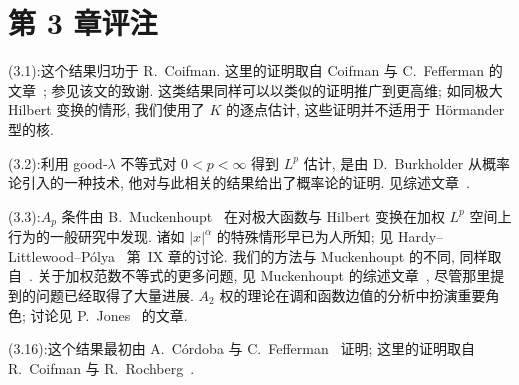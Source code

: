 \section{第 3 章评注}
\label{sec:3.4}

\noindent (3.1):\quad 这个结果归功于 R.~Coifman. 这里的证明取自 Coifman 与 C.~Fefferman 的文章~\cite{coifman-fefferman}; 参见该文的致谢. 这类结果同样可以以类似的证明推广到更高维; 如同极大 Hilbert 变换的情形, 我们使用了 $K$ 的逐点估计, 这些证明并不适用于 H\"ormander 型的核.

\noindent (3.2):\quad 利用 good-$\lambda$ 不等式对 $0<p<\infty$ 得到 $L^{p}$ 估计, 是由 D.~Burkholder 从概率论引入的一种技术, 他对与此相关的结果给出了概率论的证明. 见综述文章~\cite{burkholder}.

\noindent (3.3):\quad $A_p$ 条件由 B.~Muckenhoupt~\cite{muckenhoupt-maximal} 在对极大函数与 Hilbert 变换在加权 $L^p$ 空间上行为的一般研究中发现. 诸如 $|x|^\alpha$ 的特殊情形早已为人所知; 见 Hardy--Littlewood--P\'olya~\cite{hardy-littlewood-polya} 第~IX 章的讨论. 我们的方法与 Muckenhoupt 的不同, 同样取自~\cite{coifman-fefferman}. 关于加权范数不等式的更多问题, 见 Muckenhoupt 的综述文章~\cite{muckenhoupt-classical}, 尽管那里提到的问题已经取得了大量进展. $A_2$ 权的理论在调和函数边值的分析中扮演重要角色; 讨论见 P.~Jones~\cite{jones} 的文章.

\noindent (3.16):\quad 这个结果最初由 A.~C\'ordoba 与 C.~Fefferman~\cite{cordoba-feffermanC-weighted} 证明; 这里的证明取自 R.~Coifman 与 R.~Rochberg~\cite{coifman-rochberg}.
